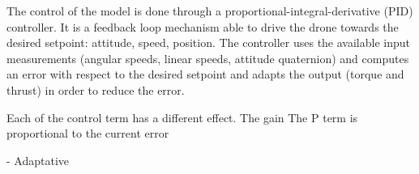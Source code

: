 The control of the model is done through a proportional-integral-derivative
(PID) controller. It is a feedback loop mechanism able to drive the drone
towards the desired setpoint: attitude, speed, position. The controller uses
the available input measurements (angular speeds, linear speeds, attitude
quaternion) and computes an error with respect to the desired setpoint and
adapts the output (torque and thrust) in order to reduce the error. 


Each
of the control term has a different effect. The gain The P term is proportional
to the current error


 - Adaptative
